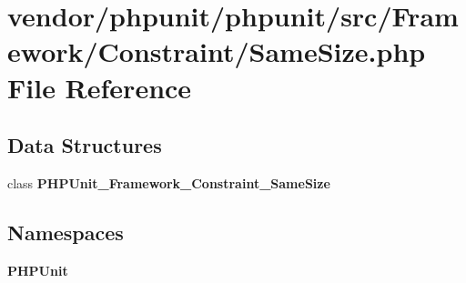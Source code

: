 \section{vendor/phpunit/phpunit/src/\+Framework/\+Constraint/\+Same\+Size.php File Reference}
\label{_same_size_8php}
\subsection*{Data Structures}
\begin{DoxyCompactItemize}
\item 
class {\bf P\+H\+P\+Unit\+\_\+\+Framework\+\_\+\+Constraint\+\_\+\+Same\+Size}
\end{DoxyCompactItemize}
\subsection*{Namespaces}
\begin{DoxyCompactItemize}
\item 
 {\bf P\+H\+P\+Unit}
\end{DoxyCompactItemize}

